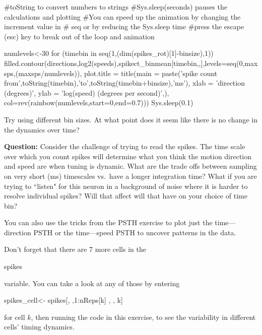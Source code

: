 \documentclass[
letterpaper, %
11pt, %
 oneside, 
onecolumn, %
]{memoir}
\numberwithin{Exercise}{chapter}
\begin{document}
\begin{shortrcode}

#toString to convert numbers to strings
#Sys.sleep(seconds) pauses the calculations and plotting
#You can speed up the animation by changing the increment value in 
#			seq or by reducing the Sys.sleep time
#press the escape (esc) key to break out of the loop and animation

numlevels<-30
for (timebin in seq(1,(dim(spikes_rot)[1]-binsize),1)){
  filled.contour(directions,log2(speeds),spikect_binmean[timebin,,],levels=seq(0,maxsps,(maxsps/numlevels)),
                 plot.title = title(main = paste('spike count from',toString(timebin),'to',toString(timebin+binsize),'ms'),
                                    xlab =  'direction (degrees)',
                                    ylab = 'log(speed) (degrees per second)',),
                 col=rev(rainbow(numlevels,start=0,end=0.7)))
  Sys.sleep(0.1)
}
\end{shortrcode}

Try using different bin sizes.   At what point does it seem like there is no change in the dynamics over time? \newline

\textbf{Question:}  Consider the challenge of trying to read the spikes.  The time scale over which you count spikes will determine what you think the motion direction and speed are when tuning is dynamic.  What are the trade offs between sampling on very short (ms) timescales vs.\ have a longer integration time?  What if you are trying to ``listen" for this neuron in a background of noise where it is harder to resolve individual spikes?  Will that affect will that have on your choice of time bin? 

You can also use the tricks from the PSTH exercise to plot just the time---direction PSTH or the time---speed PSTH to uncover patterns in the data. 

Don't forget that there are 7 more cells in the \begin{ttfamily}spikes\end{ttfamily} variable. You can take a look at any of those by entering 

\begin{shortrcode}
spikes_cell<- spikes[, ,1:nReps[k] , , k] 
\end{shortrcode}

for cell $k$, then running the code in this exercise, to see the variability in different cells' timing dynamics.
\end{document}
